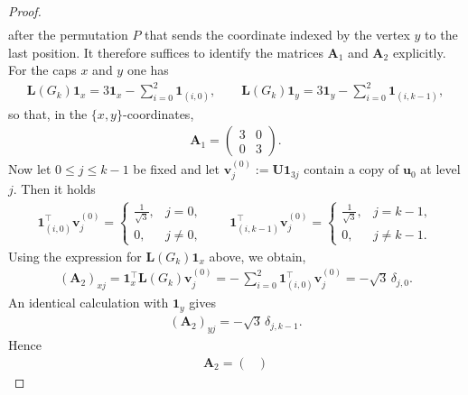 \documentclass[10pt,a4paper]{amsart}
\begin{document}
\begin{proof}
\begin{align*}
        \end{align*}
    after the permutation $P$ that sends the coordinate indexed by the vertex $y$ to the last position. It therefore suffices to identify the matrices $\mathbf{A}_1$ and $\mathbf{A}_2$ explicitly. For the caps $x$ and $y$ one has
        \begin{align*}
            \mathbf{L}(G_k)\mathbf{1}_x=3\mathbf{1}_x-\sum_{i=0}^2\mathbf{1}_{(i,0)},
            \qquad
            \mathbf{L}(G_k)\mathbf{1}_y=3\mathbf{1}_y-\sum_{i=0}^2\mathbf{1}_{(i,k-1)},
        \end{align*}
    so that, in the $\{x,y\}$-coordinates,
        \begin{align*}
            \mathbf{A}_1=\begin{pmatrix}3&0\\[2pt]0&3\end{pmatrix}.
        \end{align*}
    Now let $0\le j\le k-1$ be fixed and let $\mathbf{v}^{(0)}_j:=\mathbf{U}\mathbf{1}_{3j}$ contain a copy of $\mathbf{u}_0$ at level $j$. Then it holds
        \begin{align*} 
            \mathbf{1}_{(i,0)}^{\top}\mathbf{v}^{(0)}_j=
            \begin{cases}
            \frac1{\sqrt3},&j=0,\\
            0,&j\ne 0,
            \end{cases}
            \qquad
            \mathbf{1}_{(i,k-1)}^{\top}\mathbf{v}^{(0)}_j=
            \begin{cases}
            \frac1{\sqrt3},&j=k-1,\\
            0,&j\ne k-1.
            \end{cases}
        \end{align*}
    Using the expression for $\mathbf{L}(G_k)\mathbf{1}_x$ above, we obtain, 
        \begin{align*}
            (\mathbf{A}_2)_{xj}=\mathbf{1}_x^{\top}\mathbf{L}(G_k)\mathbf{v}^{(0)}_j
            =-\,\sum_{i=0}^2\mathbf{1}_{(i,0)}^{\top}\mathbf{v}^{(0)}_j
            =-\sqrt3\,\delta_{j,0}.
        \end{align*}
    An identical calculation with $\mathbf{1}_y$ gives
        \begin{align*}
            (\mathbf{A}_2)_{yj}=-\sqrt3\,\delta_{j,k-1}.
        \end{align*}
    Hence
        \begin{align*}
            \mathbf{A}_2=\begin{pmatrix}

\end{pmatrix}
\end{align*}
\end{proof}
\end{document}
